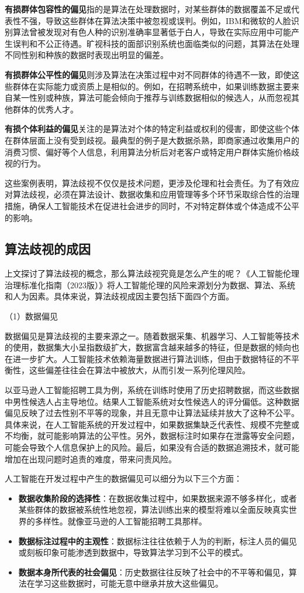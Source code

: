 \textbf{有损群体包容性的偏见}指的是算法在处理数据时，对某些群体的数据覆盖不足或代表性不强，导致这些群体在算法决策中被忽视或误判。例如，IBM和微软的人脸识别算法曾被发现对有色人种的识别准确率显著低于白人，导致在实际应用中可能产生误判和不公正待遇。旷视科技的面部识别系统也面临类似的问题，其算法在处理不同性别和种族的数据时表现出明显的偏差。

\textbf{有损群体公平性的偏见}则涉及算法在决策过程中对不同群体的待遇不一致，即使这些群体在实际能力或资质上是相似的。例如，在招聘系统中，如果训练数据主要来自某一性别或种族，算法可能会倾向于推荐与训练数据相似的候选人，从而忽视其他群体的优秀人才。

\textbf{有损个体利益的偏见}关注的是算法对个体的特定利益或权利的侵害，即使这些个体在群体层面上没有受到歧视。最典型的例子是大数据杀熟，即商家通过收集用户的消费习惯、偏好等个人信息，利用算法分析后对老客户或特定用户群体实施价格歧视的行为。

这些案例表明，算法歧视不仅仅是技术问题，更涉及伦理和社会责任。为了有效应对算法歧视，必须在算法设计、数据收集和应用管理等多个环节采取综合性的治理措施，确保人工智能技术在促进社会进步的同时，不对特定群体或个体造成不公平的影响。

\subsection{算法歧视的成因}
上文探讨了算法歧视的概念，那么算法歧视究竟是怎么产生的呢？《人工智能伦理治理标准化指南（2023版）》将人工智能伦理的风险来源划分为数据、算法、系统和人为因素。具体来说，算法歧视成因主要包括下面四个方面。

（1）数据偏见

数据偏见是算法歧视的主要来源之一。随着数据采集、机器学习、人工智能等技术的使用，数据集大小呈指数级扩大，数据富含越来越多的特征，但是数据的倾向也在进一步扩大。人工智能技术依赖海量数据进行算法训练，但由于数据特征的不平衡性，这些偏差往往会在算法中被放大，从而引发一系列伦理风险。

以亚马逊人工智能招聘工具为例，系统在训练时使用了历史招聘数据，而这些数据中男性候选人占主导地位。结果人工智能系统对女性候选人的评分偏低。这种数据偏见反映了过去性别不平等的现象，并且无意中让算法延续并放大了这种不公平。具体来说，在人工智能系统的开发过程中，如果数据集缺乏代表性、规模不完整或不均衡，就可能影响算法的公平性。另外，数据标注时如果存在泄露等安全问题，可能会导致个人信息保护上的风险。最后，如果没有合适的数据追溯技术，就可能增加在出现问题时追责的难度，带来问责风险。

人工智能在开发过程中产生的数据偏见可以细分为以下三个方面：
\begin{itemize}
\item \textbf{数据收集阶段的选择性}：在数据收集过程中，如果数据来源不够多样化，或者某些群体的数据被系统性地忽视，算法训练出来的模型将难以全面反映真实世界的多样性。就像亚马逊的人工智能招聘工具那样。
\item \textbf{数据标注过程中的主观性}：数据标注往往依赖于人为的判断，标注人员的偏见或刻板印象可能渗透到数据中，导致算法学习到不公平的模式。
\item \textbf{数据本身所代表的社会偏见}：历史数据往往反映了社会中的不平等和偏见，算法在学习这些数据时，可能无意中继承并放大这些偏见。
\end{itemize}

